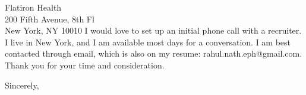 \documentclass[11pt]{letter} %
\begin{document}
\begin{letter}{Flatiron Health \\
200 Fifth Avenue, 8th Fl \\
New York, NY 10010}
I would love to set up an initial phone call with a recruiter. I live in New York, and I am available most days for a conversation. I am best contacted through email, which is also on my resume: rahul.nath.eph@gmail.com. Thank you for your time and consideration.

\closing{Sincerely,}


\end{letter}
\end{document}
